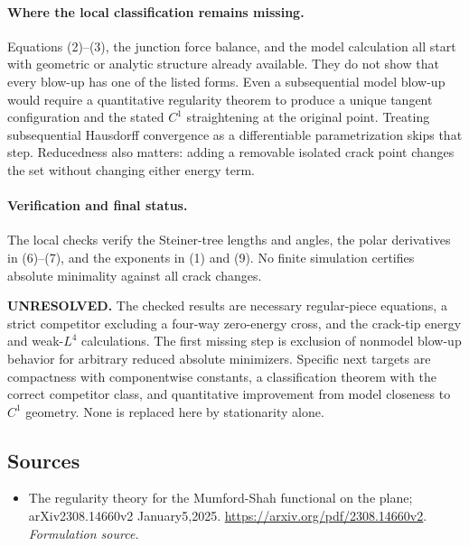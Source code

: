 \documentclass[11pt]{article}
\begin{document}
\paragraph{Where the local classification remains missing.}
Equations (2)--(3), the junction force balance, and the model calculation
all start with geometric or analytic structure already available.
They do not show that every blow-up has one of the listed forms.
Even a subsequential model blow-up would require a quantitative
regularity theorem to produce a unique tangent configuration and the
stated $C^1$ straightening at the original point. Treating subsequential
Hausdorff convergence as a differentiable parametrization skips that
step. Reducedness also matters: adding a removable isolated crack
point changes the set without changing either energy term.

\paragraph{Verification and final status.}
The local checks verify the Steiner-tree lengths and angles, the polar
derivatives in (6)--(7), and the exponents in (1) and (9). No finite
simulation certifies absolute minimality against all crack changes.

\textbf{UNRESOLVED.} The checked results are necessary regular-piece
equations, a strict competitor excluding a four-way zero-energy cross,
and the crack-tip energy and weak-$L^4$ calculations. The first missing
step is exclusion of nonmodel blow-up behavior for arbitrary reduced
absolute minimizers. Specific next targets are compactness with
componentwise constants, a classification theorem with the correct
competitor class, and quantitative improvement from model closeness to
$C^1$ geometry. None is replaced here by stationarity alone.

\subsection{Sources}
\begin{itemize}
\item[S1]The regularity theory for the Mumford-Shah functional on the plane; arXiv2308.14660v2 January5,2025.
\url{https://arxiv.org/pdf/2308.14660v2}.
\textit{Formulation source.}
\end{itemize}
\end{document}
